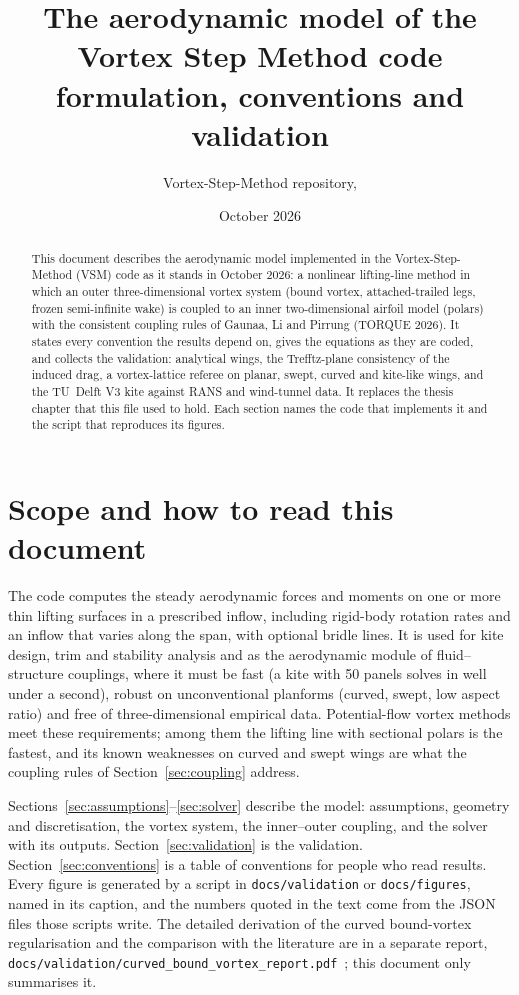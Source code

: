 \documentclass[11pt,a4paper]{article}
\title{The aerodynamic model of the Vortex Step Method code\\[4pt]\large formulation, conventions and validation}
\author{Vortex-Step-Method repository, \code{docs/aerodynamic\_model/aerodynamic\_model.tex}}
\date{October 2026}
\newcommand{\code}[1]{\texttt{#1}}
\begin{document}
\maketitle

\begin{abstract}
\noindent This document describes the aerodynamic model implemented in the Vortex-Step-Method (VSM) code as it stands in October 2026: a nonlinear lifting-line method in which an outer three-dimensional vortex system (bound vortex, attached-trailed legs, frozen semi-infinite wake) is coupled to an inner two-dimensional airfoil model (polars) with the consistent coupling rules of Gaunaa, Li and Pirrung (TORQUE 2026). It states every convention the results depend on, gives the equations as they are coded, and collects the validation: analytical wings, the Trefftz-plane consistency of the induced drag, a vortex-lattice referee on planar, swept, curved and kite-like wings, and the TU~Delft V3 kite against RANS and wind-tunnel data. It replaces the thesis chapter that this file used to hold. Each section names the code that implements it and the script that reproduces its figures.
\end{abstract}

\tableofcontents

\section{Scope and how to read this document}
\label{sec:scope}
The code computes the steady aerodynamic forces and moments on one or more thin lifting surfaces in a prescribed inflow, including rigid-body rotation rates and an inflow that varies along the span, with optional bridle lines. It is used for kite design, trim and stability analysis and as the aerodynamic module of fluid--structure couplings, where it must be fast (a kite with 50 panels solves in well under a second), robust on unconventional planforms (curved, swept, low aspect ratio) and free of three-dimensional empirical data. Potential-flow vortex methods meet these requirements; among them the lifting line with sectional polars is the fastest, and its known weaknesses on curved and swept wings are what the coupling rules of Section~\ref{sec:coupling} address.

Sections~\ref{sec:assumptions}--\ref{sec:solver} describe the model: assumptions, geometry and discretisation, the vortex system, the inner--outer coupling, and the solver with its outputs. Section~\ref{sec:validation} is the validation. Section~\ref{sec:conventions} is a table of conventions for people who read results. Every figure is generated by a script in \code{docs/validation} or \code{docs/figures}, named in its caption, and the numbers quoted in the text come from the JSON files those scripts write. The detailed derivation of the curved bound-vortex regularisation and the comparison with the literature are in a separate report, \code{docs/validation/curved\_bound\_vortex\_report.pdf}~\cite{report}; this document only summarises it.
\end{document}
